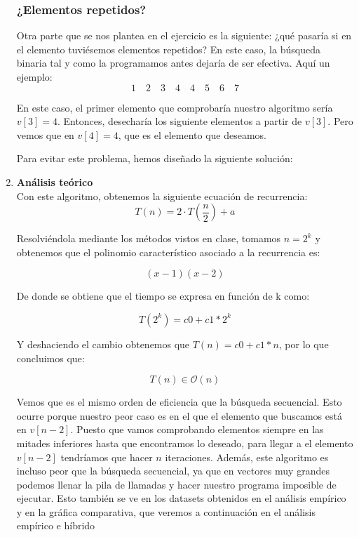 \documentclass[10pt,a4paper]{article}
\begin{document}
\begin{enumerate}
\subsubsection{¿Elementos repetidos?}
Otra parte que se nos plantea en el ejercicio es la siguiente: ¿qué pasaría si en el elemento tuviésemos elementos repetidos? En este caso, la búsqueda binaria tal y como la programamos antes dejaría de ser efectiva. Aquí un ejemplo:
\[
	1 \quad 2 \quad 3 \quad 4 \quad 4 \quad 5 \quad 6 \quad 7
\]

En este caso, el primer elemento que comprobaría nuestro algoritmo sería \(v[3] = 4\). Entonces, desecharía los siguiente elementos a partir de \(v[3]\). Pero vemos que en \(v[4] = 4\), que es el elemento que deseamos. 

Para evitar este problema, hemos diseñado la siguiente solución:



\item \textbf{Análisis teórico}\\

Con este algoritmo, obtenemos la siguiente ecuación de recurrencia:
\[
	T(n) = 2 \cdot T \left( \frac{n}{2} \right) + a
\]

Resolviéndola mediante los métodos vistos en clase, tomamos $n = 2^k$ y obtenemos que el polinomio característico asociado a la recurrencia es:

\[
	(x-1)(x-2)
\]

De donde se obtiene que el tiempo se expresa en función de k como:

\[
	T(2^k) = c0 + c1*2^k
\]

Y deshaciendo el cambio obtenemos que $T(n) = c0 + c1*n$, por lo que concluimos que:

\[
	T(n) \in \mathcal{O}(n)
\]

Vemos que es el mismo orden de eficiencia que la búsqueda secuencial. Esto ocurre porque nuestro peor caso es en el que el elemento que buscamos está en \(v[n-2]\). Puesto que vamos comprobando elementos siempre en las mitades inferiores hasta que encontramos lo deseado, para llegar a el elemento \(v[n-2]\) tendríamos que hacer \(n\) iteraciones. Además, este algoritmo es incluso peor que la búsqueda secuencial, ya que en vectores muy grandes podemos llenar la pila de llamadas y hacer nuestro programa imposible de ejecutar. Esto también se ve en los datasets obtenidos en el análisis empírico y en la gráfica comparativa, que veremos a continuación en el análisis empírico e híbrido


\end{enumerate}
\end{document}
